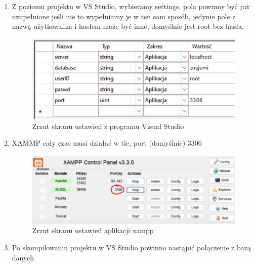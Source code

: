 \documentclass[12pt,a4paper]{article}
\begin{document}
\begin{enumerate}
            \item Z poziomu projektu w VS Studio, wybieramy settings, pola powinny być już uzupełnione jeśli nie to wypełniamy je w ten sam sposób, jedynie pole z nazwą użytkownika i hasłem może być inne, domyślnie jest root bez hasła.
                
                \begin{figure}[H]
                    \centering
                    \includegraphics[scale=0.4]{images/settings.png}
                    \caption{Zrzut ekranu ustawień z programu Visual Studio}
                \end{figure}
                
            \item XAMMP cały czas musi działać w tle, port (domyślnie) 3306
                
                \begin{figure}[H]
                    \centering
                    \includegraphics[scale=0.4]{images/xampp.png}
                    \caption{Zrzut ekranu ustawień aplikacji xampp}
                \end{figure}
                    
            \item Po skompilowaniu projektu w VS Studio powinno nastąpić połączenie z bazą danych
                    
        \end{enumerate}
        
\end{document}

